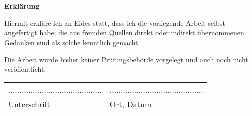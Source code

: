 \chapter*{}\label{ch:erklaerung}
\begin{center}
    \large \textbf{Erklärung}
\end{center}
Hiermit erkläre ich an Eides statt, dass ich die vorliegende Arbeit selbst angefertigt habe; die aus fremden Quellen direkt oder indirekt übernommenen Gedanken sind als solche kenntlich gemacht.

Die Arbeit wurde bisher keiner Prüfungsbehörde vorgelegt und auch noch nicht veröffentlicht.

\vspace{2\baselineskip}

\begin{tabular}{ll}
    .......................................... & .......................................... \\
    Unterschrift                               & Ort, Datum
\end{tabular}
